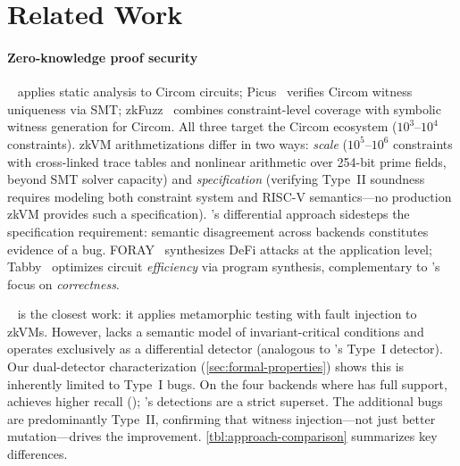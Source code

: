 \section{Related Work}\label{sec:related}

\paragraph{Zero-knowledge proof security}
\zkap~\cite{zkap} applies static analysis to Circom circuits; Picus~\cite{picus} verifies Circom witness uniqueness via SMT; zkFuzz~\cite{zkfuzz} combines constraint-level coverage with symbolic witness generation for Circom. All three target the Circom ecosystem ($10^3$--$10^4$ constraints). zkVM arithmetizations differ in two ways: \emph{scale} ($10^5$--$10^6$ constraints with cross-linked trace tables and nonlinear arithmetic over 254-bit prime fields, beyond SMT solver capacity) and \emph{specification} (verifying Type~II soundness requires modeling both constraint system and RISC-V semantics---no production zkVM provides such a specification). \tool's differential approach sidesteps the specification requirement: semantic disagreement across backends constitutes evidence of a bug. FORAY~\cite{foray} synthesizes DeFi attacks at the application level; Tabby~\cite{tabby} optimizes circuit \emph{efficiency} via program synthesis, complementary to \tool's focus on \emph{correctness}.

\arguzz~\cite{arguzz} is the closest work: it applies metamorphic testing with fault injection to zkVMs. However, \arguzz lacks a semantic model of invariant-critical conditions and operates exclusively as a differential detector (analogous to \tool's Type~I detector). Our dual-detector characterization (\autoref{sec:formal-properties}) shows this is inherently limited to Type~I bugs. On the four backends where \arguzz has full support, \tool achieves \tbd{$1.5\times$} higher recall (); \tool's detections are a strict superset. The additional bugs are predominantly Type~II, confirming that witness injection---not just better mutation---drives the improvement. \autoref{tbl:approach-comparison} summarizes key differences.


